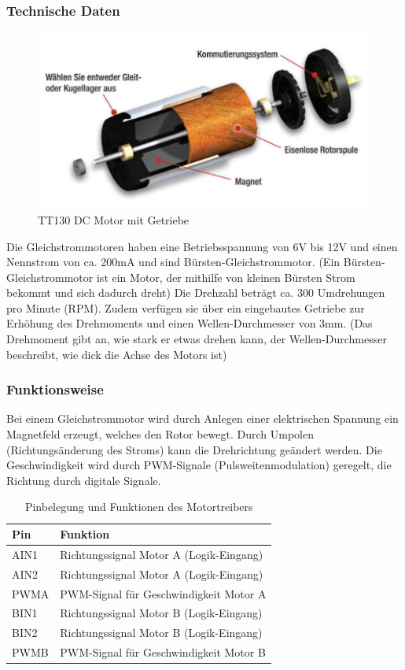 \subsubsection{Technische Daten}
\begin{figure}[H]
    \centering
    \includegraphics[width=1\textwidth]{img/Hardware/gleichstrommotor.png}
    \caption{TT130 DC Motor mit Getriebe}
    \label{fig:gleichstrommotor}
\end{figure}
Die Gleichstrommotoren haben eine Betriebsspannung von 6V bis 12V und einen Nennstrom von ca. 200mA und sind Bürsten-Gleichstrommotor.
%
(Ein Bürsten-Gleichstrommotor ist ein Motor, der mithilfe von kleinen Bürsten Strom bekommt und sich dadurch dreht)
Die Drehzahl beträgt ca. 300 Umdrehungen pro Minute (RPM).
%
Zudem verfügen sie über ein eingebautes Getriebe zur Erhöhung des Drehmoments und einen Wellen-Durchmesser von 3mm.
%
(Das Drehmoment gibt an,
wie stark er etwas drehen kann,
der Wellen-Durchmesser beschreibt,
wie dick die Achse des Motors ist)
\subsubsection{Funktionsweise}
Bei einem Gleichstrommotor wird durch Anlegen einer elektrischen Spannung ein Magnetfeld erzeugt,
welches den Rotor bewegt.
%
Durch Umpolen (Richtungsänderung des Stroms) kann die Drehrichtung geändert werden.
%
Die Geschwindigkeit wird durch PWM-Signale (Pulsweitenmodulation) geregelt,
die Richtung durch digitale Signale.

\begin{table}[h]
    \centering
    \begin{tabular}{|l|p{10cm}|}
    \hline
    \textbf{Pin} & \textbf{Funktion} \\
    \hline
    AIN1  & Richtungssignal Motor A (Logik-Eingang) \\
    AIN2  & Richtungssignal Motor A (Logik-Eingang) \\
    PWMA  & PWM-Signal für Geschwindigkeit Motor A \\
    BIN1  & Richtungssignal Motor B (Logik-Eingang) \\
    BIN2  & Richtungssignal Motor B (Logik-Eingang) \\
    PWMB  & PWM-Signal für Geschwindigkeit Motor B \\
    \hline
    \end{tabular}
    \caption{Pinbelegung und Funktionen des Motortreibers}
    \end{table}

